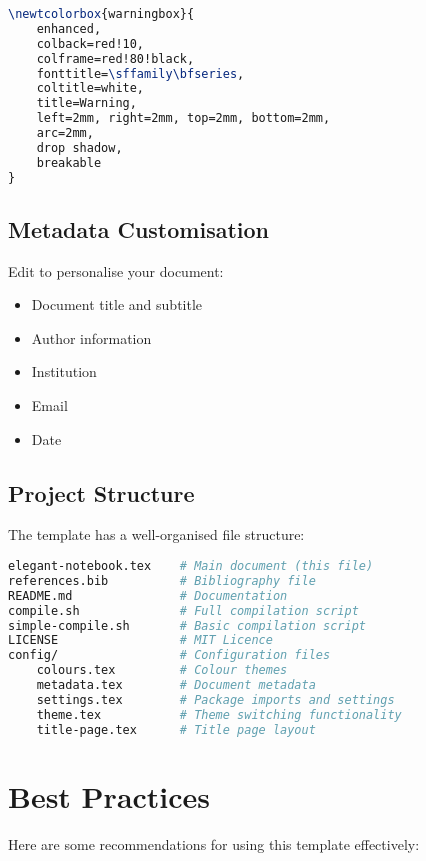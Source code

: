 \documentclass[a4paper,11pt]{article}
\begin{document}
\begin{lstlisting}[language=TeX, caption={Creating a custom box type}, label={lst:custombox}]
\newtcolorbox{warningbox}{
    enhanced,
    colback=red!10,
    colframe=red!80!black,
    fonttitle=\sffamily\bfseries,
    coltitle=white,
    title=Warning,
    left=2mm, right=2mm, top=2mm, bottom=2mm,
    arc=2mm,
    drop shadow,
    breakable
}
\end{lstlisting}

\subsection{Metadata Customisation}
Edit  to personalise your document:
\begin{itemize}
    \item Document title and subtitle
    \item Author information
    \item Institution
    \item Email
    \item Date
\end{itemize}

\subsection{Project Structure}
The template has a well-organised file structure:

\begin{lstlisting}[language=bash, caption={Project directory structure}, label={lst:structure}]
elegant-notebook.tex    # Main document (this file)
references.bib          # Bibliography file
README.md               # Documentation
compile.sh              # Full compilation script
simple-compile.sh       # Basic compilation script
LICENSE                 # MIT Licence
config/                 # Configuration files
    colours.tex         # Colour themes
    metadata.tex        # Document metadata
    settings.tex        # Package imports and settings
    theme.tex           # Theme switching functionality
    title-page.tex      # Title page layout
\end{lstlisting}

\section{Best Practices}
Here are some recommendations for using this template effectively:
\end{document}
